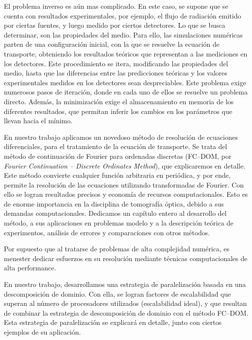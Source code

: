 El problema inverso es aún mas complicado. 
En este caso, se supone que se cuenta con resultados experimentales, 
por ejemplo, el flujo de radiación emitido por ciertas fuentes, 
y luego medido por ciertos detectores. 
Lo que se busca determinar, son las propiedades del medio.  
Para ello, las simulaciones numéricas parten de   
una configuración inicial, con la que se resuelve la ecuación de transporte, 
obteniendo los resultados teóricos que representan a las 
mediciones en los detectores. 
Este procedimiento se itera, modificando las propiedades del medio, hasta que las 
diferencias entre las predicciones teóricas y los valores experimentales 
medidos en los detectores sean despreciables.
Este problema exige numerosos pasos de iteración, 
donde en cada uno de ellos se resuelve un problema directo. 
Además, la minimización exige el almacenamiento en memoria de 
los diferentes resultados, que permitan inferir los cambios en 
los parámetros que llevan hacia el mínimo.

En nuestro trabajo aplicamos un novedoso método de resolución de 
ecuaciones diferenciales, para el tratamiento de la ecuación de 
transporte. Se trata del método de continuación de Fourier para 
ordenadas discretas (FC--DOM, por {\it Fourier Continuation -- Discrete 
Ordinates Method}), que explicaremos en detalle. 
Este método convierte cualquier función arbitraria en 
periódica, y por ende, permite la resolución de las ecuaciones 
utilizando transformadas de Fourier. Con ello se logran resultados 
precisos y economía de recursos computacionales. Esto es de enorme importancia 
en la disciplina de tomografía óptica, debido a sus demandas computacionales. 
Dedicamos un capítulo entero al desarrollo del método, a
sus aplicaciones en problemas modelo y a la descripción teórica de 
experimentos, análisis de errores y comparaciones con 
otros métodos.

Por supuesto que al tratarse de problemas de alta complejidad 
numérica, es menester dedicar esfuerzos en su resolución mediante 
técnicas computacionales de alta performance. 

En nuestro trabajo, desarrollamos una estrategia de paralelización 
basada en una descomposición de dominio. Con ella, se logran factores 
de escalabilidad que superan al 
número de procesadores utilizados (escalabilidad ideal), y que resultan de combinar la estrategia  de descomposición de dominio 
con el método FC--DOM.
Esta estrategia de paralelización se explicará en detalle, 
junto con ciertos ejemplos de su aplicación.

